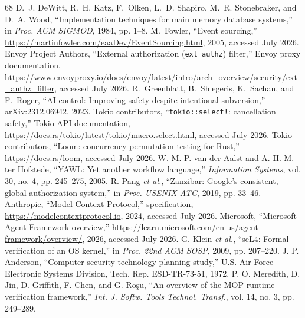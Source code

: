 \documentclass[10pt,journal,compsoc]{IEEEtran}
\begin{document}
\begin{thebibliography}{68}
 D.~J. DeWitt, R.~H. Katz, F.~Olken, L.~D. Shapiro,
M.~R. Stonebraker, and D.~A. Wood, ``Implementation techniques for main
memory database systems,'' in \emph{Proc. ACM SIGMOD}, 1984, pp. 1--8.
 M.~Fowler, ``Event sourcing,''
\url{https://martinfowler.com/eaaDev/EventSourcing.html}, 2005, accessed
July 2026.
 Envoy Project Authors, ``External authorization
(\texttt{ext\_authz}) filter,'' Envoy proxy documentation,
\url{https://www.envoyproxy.io/docs/envoy/latest/intro/arch_overview/security/ext_authz_filter},
accessed July 2026.
 R.~Greenblatt, B.~Shlegeris, K.~Sachan, and F.~Roger,
``AI control: Improving safety despite intentional subversion,''
arXiv:2312.06942, 2023.
 Tokio contributors, ``\texttt{tokio::select!}:
cancellation safety,'' Tokio API documentation,
\url{https://docs.rs/tokio/latest/tokio/macro.select.html}, accessed July
2026.
 Tokio contributors, ``Loom: concurrency permutation testing
for Rust,'' \url{https://docs.rs/loom}, accessed July 2026.
 W. M. P. van der Aalst and A. H. M. ter Hofstede, ``YAWL:
Yet another workflow language,'' \emph{Information Systems}, vol. 30, no. 4,
pp. 245--275, 2005.
 R. Pang \emph{et al.}, ``Zanzibar: Google's consistent,
global authorization system,'' in \emph{Proc. USENIX ATC}, 2019,
pp. 33--46.
 Anthropic, ``Model Context Protocol,'' specification,
\url{https://modelcontextprotocol.io}, 2024, accessed July 2026.
 Microsoft, ``Microsoft Agent Framework overview,''
\url{https://learn.microsoft.com/en-us/agent-framework/overview/}, 2026,
accessed July 2026.
 G. Klein \emph{et al.}, ``seL4: Formal verification of an
OS kernel,'' in \emph{Proc. 22nd ACM SOSP}, 2009, pp. 207--220.
 J. P. Anderson, ``Computer security technology planning
study,'' U.S. Air Force Electronic Systems Division, Tech. Rep. ESD-TR-73-51,
1972.
 P. O. Meredith, D. Jin, D. Griffith, F. Chen, and
G. Ro\c{s}u, ``An overview of the MOP runtime verification framework,''
\emph{Int. J. Softw. Tools Technol. Transf.}, vol. 14, no. 3, pp. 249--289,

\end{thebibliography}
\end{document}
